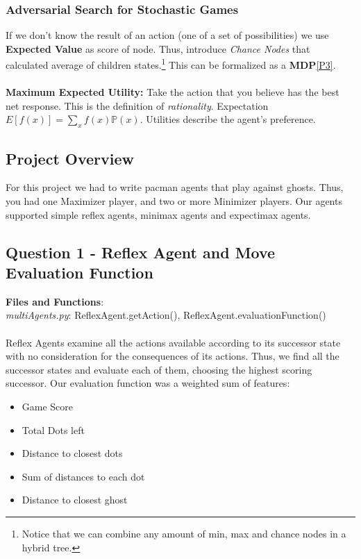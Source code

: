 \documentclass[]{article}
\begin{document}
\subsubsection{Adversarial Search for Stochastic Games}

If we don't know the result of an action (one of a set of possibilities) we use \textbf{Expected Value} as score of node. Thus, introduce \emph{Chance Nodes} that calculated average of children states.\footnote{Notice that we can combine any amount of min, max and chance nodes in a hybrid tree.} This can be formalized as a \textbf{MDP}\ref{P3}.

\paragraph{}

\textbf{Maximum Expected Utility:} Take the action that you believe has the best net response. This is the definition of \emph{rationality}. Expectation $E[f(x)] = \sum_x f(x) \mathbb{P}(x)$. Utilities describe the agent's preference.

\subsection{Project Overview}

For this project we had to write pacman agents that play against ghosts. Thus, you had one Maximizer player, and two or more Minimizer players. Our agents supported simple reflex agents, minimax agents and expectimax agents.

\subsection{Question 1 - Reflex Agent and Move Evaluation Function}

\textbf{Files and Functions}: \\
\emph{multiAgents.py}: ReflexAgent.getAction(), ReflexAgent.evaluationFunction()

\paragraph{}

Reflex Agents examine all the actions available according to its successor state with no consideration for the consequences of its actions. Thus, we find all the successor states and evaluate each of them, choosing the highest scoring successor. Our evaluation function was a weighted sum of features:
\begin{itemize}
    \item Game Score
    \item Total Dots left
    \item Distance to closest dots
    \item Sum of distances to each dot
    \item Distance to closest ghost
\end{itemize}
\end{document}
